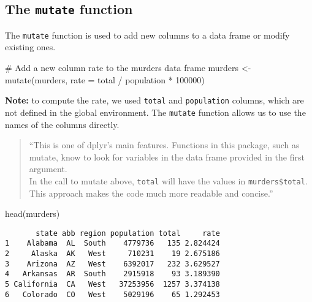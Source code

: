 \documentclass[
  letterpaper,
  DIV=11,
  numbers=noendperiod]{scrreprt}
\newenvironment{Shaded}{\begin{snugshade}}{\end{snugshade}}
\newcommand{\AttributeTok}[1]{\textcolor[rgb]{0.40,0.45,0.13}{#1}}
\newcommand{\CommentTok}[1]{\textcolor[rgb]{0.37,0.37,0.37}{#1}}
\newcommand{\DecValTok}[1]{\textcolor[rgb]{0.68,0.00,0.00}{#1}}
\newcommand{\FunctionTok}[1]{\textcolor[rgb]{0.28,0.35,0.67}{#1}}
\newcommand{\NormalTok}[1]{\textcolor[rgb]{0.00,0.23,0.31}{#1}}
\newcommand{\OtherTok}[1]{\textcolor[rgb]{0.00,0.23,0.31}{#1}}
\newcommand{\SpecialCharTok}[1]{\textcolor[rgb]{0.37,0.37,0.37}{#1}}
\begin{document}
\subsection{\texorpdfstring{The \texttt{mutate}
function}{The mutate function}}\label{the-mutate-function}

The \texttt{mutate} function is used to add new columns to a data frame
or modify existing ones.

\begin{Shaded}
\begin{Highlighting}[]
\CommentTok{\# Add a new column \textquotesingle{}rate\textquotesingle{} to the murders data frame}
\NormalTok{murders  }\OtherTok{\textless{}{-}} \FunctionTok{mutate}\NormalTok{(murders, }\AttributeTok{rate =}\NormalTok{ total }\SpecialCharTok{/}\NormalTok{ population }\SpecialCharTok{*} \DecValTok{100000}\NormalTok{)}
\end{Highlighting}
\end{Shaded}

\textbf{Note:} to compute the rate, we used \texttt{total} and
\texttt{population} columns, which are not defined in the global
environment. The \texttt{mutate} function allows us to use the names of
the columns directly.

\begin{quote}
``This is one of dplyr's main features. Functions in this package, such
as mutate, know to look for variables in the data frame provided in the
first argument.\\
In the call to mutate above, \texttt{total} will have the values in
\texttt{murders\$total}. This approach makes the code much more readable
and concise.''
\end{quote}

\begin{Shaded}
\begin{Highlighting}[]
\FunctionTok{head}\NormalTok{(murders)}
\end{Highlighting}
\end{Shaded}

\begin{verbatim}
       state abb region population total     rate
1    Alabama  AL  South    4779736   135 2.824424
2     Alaska  AK   West     710231    19 2.675186
3    Arizona  AZ   West    6392017   232 3.629527
4   Arkansas  AR  South    2915918    93 3.189390
5 California  CA   West   37253956  1257 3.374138
6   Colorado  CO   West    5029196    65 1.292453
\end{verbatim}
\end{document}
